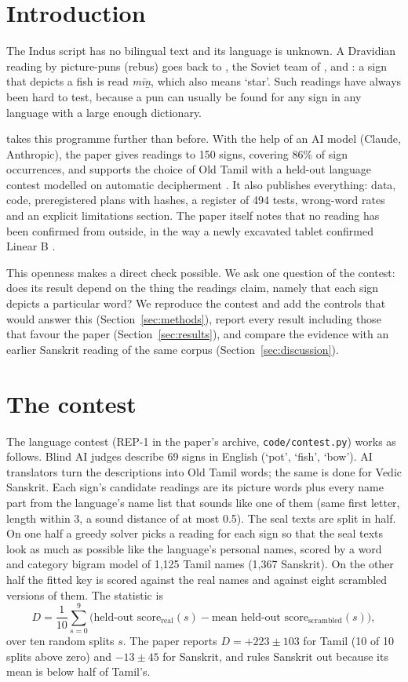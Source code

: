 \documentclass[11pt,a4paper]{article}
\newcommand{\tl}[1]{\emph{#1}}
\begin{document}
\section{Introduction}

The Indus script has no bilingual text and its language is unknown. A Dravidian reading by picture-puns (rebus) goes back to \citet{heras1953}, the Soviet team of \citet{knorozov1965}, \citet{parpola1994} and \citet{mahadevan1977}: a sign that depicts a fish is read \tl{mīṉ}, which also means `star'. Such readings have always been hard to test, because a pun can usually be found for any sign in any language with a large enough dictionary.

\citet{raj2026} takes this programme further than before. With the help of an AI model (Claude, Anthropic), the paper gives readings to 150 signs, covering 86\% of sign occurrences, and supports the choice of Old Tamil with a held-out language contest modelled on automatic decipherment \citep{snyder2010,luo2019}. It also publishes everything: data, code, preregistered plans with hashes, a register of 494 tests, wrong-word rates and an explicit limitations section. The paper itself notes that no reading has been confirmed from outside, in the way a newly excavated tablet confirmed Linear B \citep{ventris1953}.

This openness makes a direct check possible. We ask one question of the contest: does its result depend on the thing the readings claim, namely that each sign depicts a particular word? We reproduce the contest and add the controls that would answer this (Section~\ref{sec:methods}), report every result including those that favour the paper (Section~\ref{sec:results}), and compare the evidence with an earlier Sanskrit reading of the same corpus (Section~\ref{sec:discussion}).

\section{The contest}\label{sec:contest}

The language contest (REP-1 in the paper's archive, \texttt{code/contest.py}) works as follows. Blind AI judges describe 69 signs in English (`pot', `fish', `bow'). AI translators turn the descriptions into Old Tamil words; the same is done for Vedic Sanskrit. Each sign's candidate readings are its picture words plus every name part from the language's name list that sounds like one of them (same first letter, length within 3, a sound distance of at most 0.5). The seal texts are split in half. On one half a greedy solver picks a reading for each sign so that the seal texts look as much as possible like the language's personal names, scored by a word and category bigram model of 1,125 Tamil names (1,367 Sanskrit). On the other half the fitted key is scored against the real names and against eight scrambled versions of them. The statistic is
\[ D = \frac{1}{10}\sum_{s=0}^{9}\bigl(\text{held-out score}_{\text{real}}(s) - \text{mean held-out score}_{\text{scrambled}}(s)\bigr), \]
over ten random splits $s$. The paper reports $D=+223\pm103$ for Tamil (10 of 10 splits above zero) and $-13\pm45$ for Sanskrit, and rules Sanskrit out because its mean is below half of Tamil's.
\end{document}
